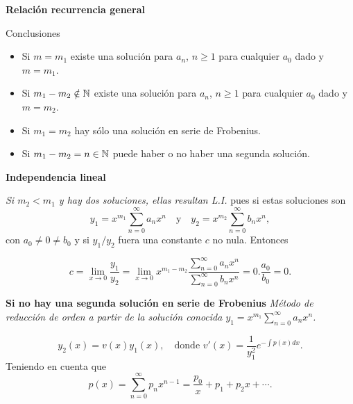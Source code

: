\begin{frame}[fragile]{\textbf{Relación recurrencia general}}


\begin{block}{Conclusiones}
 \begin{itemize}
  \item Si $m=m_1$ existe una solución para $a_n$, $n\geq 1$ para cualquier $a_0$ dado y $m=m_1$.
  \item Si $m_1-m_2\notin \mathbb{N}$ existe una solución para $a_n$, $n\geq 1$ para cualquier $a_0$ dado y $m=m_2$.
  \item Si $m_1=m_2$ hay sólo una solución en serie de Frobenius.
  \item Si $m_1-m_2=n\in \mathbb{N}$ puede haber o no haber una segunda solución.
 \end{itemize}

\end{block}

\end{frame}



\begin{frame}[fragile]{\textbf{Independencia lineal}}

\emph{Si $m_2<m_1$ y hay dos soluciones, ellas resultan  L.I.} pues si  estas soluciones son
\[y_1=x^{m_1}\sum_{n=0}^{\infty}a_nx^n\quad\text{y}\quad y_2=x^{m_2}\sum_{n=0}^{\infty}b_nx^n,\]
con $a_0\neq 0\neq b_0$ y si  $y_1/y_2$ fuera una constante $c$  no nula. Entonces

\[c=\lim_{x\to 0} \frac{y_1}{y_2}=\lim_{x\to 0} x^{m_1-m_2}\frac{\sum_{n=0}^{\infty}a_nx^n}{ \sum_{n=0}^{\infty}b_nx^n  }=0.\frac{a_0}{b_0}=0.\]




\end{frame}



\begin{frame}[fragile]{\textbf{Si no hay una segunda solución en serie de Frobenius}}
\emph{Método de reducción de orden a partir de la solución conocida $y_1=x^{m_1}\sum_{n=0}^{\infty}a_nx^n$.}

\[y_2(x)=v(x)y_1(x),\quad\text{donde  } v'(x)=\frac{1}{y_1^2}e^{-\int p(x)dx}.\]
Teniendo en cuenta que
\[p(x)=\sum_{n=0}^{\infty}p_nx^{n-1}=\frac{p_0}{x}+p_1+p_2x+\cdots.\]

\end{frame}



